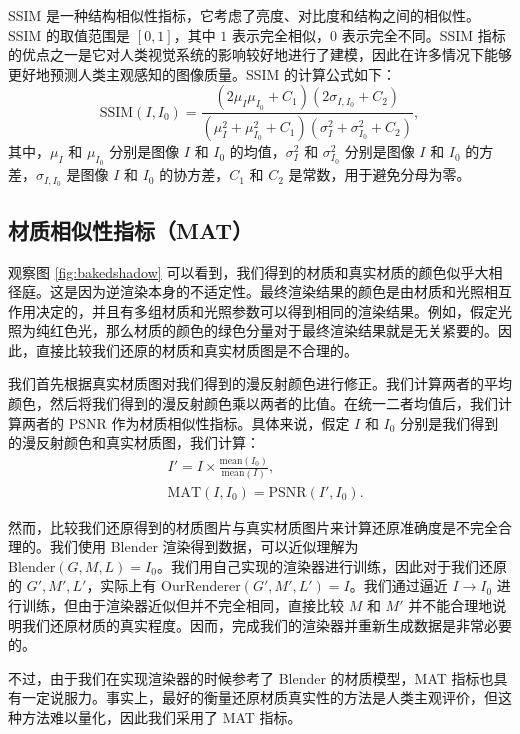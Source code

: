 SSIM 是一种结构相似性指标，它考虑了亮度、对比度和结构之间的相似性。SSIM 的取值范围是 $[0,1]$，其中 $1$ 表示完全相似，$0$ 表示完全不同。SSIM 指标的优点之一是它对人类视觉系统的影响较好地进行了建模，因此在许多情况下能够更好地预测人类主观感知的图像质量。SSIM 的计算公式如下：
\begin{equation}
  \text{SSIM}(I, I_0) = \frac{(2\mu_I\mu_{I_0} + C_1)(2\sigma_{I,I_0} + C_2)}{(\mu_I^2 + \mu_{I_0}^2 + C_1)(\sigma_I^2 + \sigma_{I_0}^2 + C_2)},
\end{equation}
其中，$\mu_I$ 和 $\mu_{I_0}$ 分别是图像 $I$ 和 $I_0$ 的均值，$\sigma_I^2$ 和 $\sigma_{I_0}^2$ 分别是图像 $I$ 和 $I_0$ 的方差，$\sigma_{I,I_0}$ 是图像 $I$ 和 $I_0$ 的协方差，$C_1$ 和 $C_2$ 是常数，用于避免分母为零。

\subsection{材质相似性指标（MAT）} \label{sec:material}

观察图 \ref{fig:bakedshadow} 可以看到，我们得到的材质和真实材质的颜色似乎大相径庭。这是因为逆渲染本身的不适定性。最终渲染结果的颜色是由材质和光照相互作用决定的，并且有多组材质和光照参数可以得到相同的渲染结果。例如，假定光照为纯红色光，那么材质的颜色的绿色分量对于最终渲染结果就是无关紧要的。因此，直接比较我们还原的材质和真实材质图是不合理的。

我们首先根据真实材质图对我们得到的漫反射颜色进行修正。我们计算两者的平均颜色，然后将我们得到的漫反射颜色乘以两者的比值。在统一二者均值后，我们计算两者的 PSNR 作为材质相似性指标。具体来说，假定 $I$ 和 $I_0$ 分别是我们得到的漫反射颜色和真实材质图，我们计算：
\begin{align}
  &I' = I \times \frac{\text{mean}(I_0)}{\text{mean}(I)}, \\
  &\text{MAT}(I, I_0) = \text{PSNR}(I', I_0).
\end{align}

然而，比较我们还原得到的材质图片与真实材质图片来计算还原准确度是不完全合理的。我们使用 Blender 渲染得到数据，可以近似理解为 $\text{Blender}(G, M, L) = I_0$。我们用自己实现的渲染器进行训练，因此对于我们还原的 $G', M', L'$，实际上有 $\text{OurRenderer}(G', M', L') = I$。我们通过逼近 $I \rightarrow I_0$ 进行训练，但由于渲染器近似但并不完全相同，直接比较 $M$ 和 $M'$ 并不能合理地说明我们还原材质的真实程度。因而，完成我们的渲染器并重新生成数据是非常必要的。

不过，由于我们在实现渲染器的时候参考了 Blender 的材质模型，MAT 指标也具有一定说服力。事实上，最好的衡量还原材质真实性的方法是人类主观评价，但这种方法难以量化，因此我们采用了 MAT 指标。

